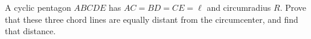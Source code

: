 A cyclic pentagon $ABCDE$ has $AC=BD=CE=\ell$ and circumradius $R$. Prove that these three chord lines are equally distant from the circumcenter, and find that distance.
